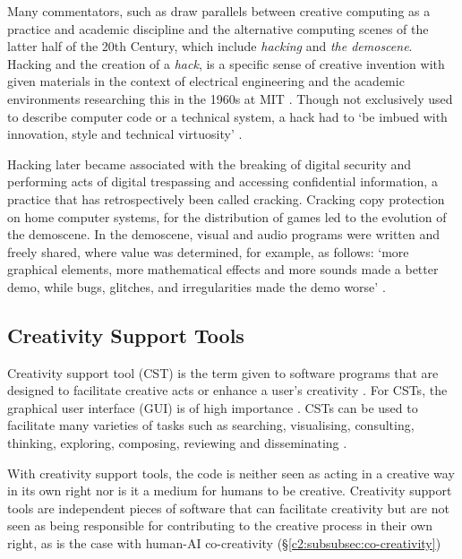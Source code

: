 Many commentators, such as \cite{clemente2025demoscene} draw parallels between creative computing as a practice and academic discipline and the alternative computing scenes of the latter half of the 20th Century, which include \textit{hacking} and \textit{the demoscene}. 
Hacking and the creation of a \textit{hack}, is a specific sense of creative invention with given materials in the context of electrical engineering and the academic environments researching this in the 1960s at MIT \citep{wark2006hackers}. 
Though not exclusively used to describe computer code or a technical system, a hack had to `be imbued with innovation, style and technical virtuosity' \citep{levy1984hackers}.

Hacking later became associated with the breaking of digital security and performing acts of digital trespassing and accessing confidential information, a practice that has retrospectively been called cracking. 
Cracking copy protection on home computer systems, for the distribution of games led to the evolution of the demoscene. 
In the demoscene, visual and audio programs were written and freely shared, where value was determined, for example, as follows: ‘more graphical elements, more mathematical effects and more sounds made a better demo, while bugs, glitches, and irregularities made the demo worse’ \citep{carlsson2019forgotten}.


\subsection{Creativity Support Tools}
\label{c2:subsec:cst}

Creativity support tool (CST) is the term given to software programs that are designed to facilitate creative acts or enhance a user's creativity \citep{shneiderman2002creativity}. 
For CSTs, the graphical user interface (GUI) is of high importance \citep{shneiderman1999user}. 
CSTs can be used to facilitate many varieties of tasks such as searching, visualising, consulting, thinking, exploring, composing, reviewing and disseminating \citep{shneiderman2002cst_tutorial}.

With creativity support tools, the code is neither seen as acting in a creative way in its own right nor is it a medium for humans to be creative. 
Creativity support tools are independent pieces of software that can facilitate creativity but are not seen as being responsible for contributing to the creative process in their own right, as is the case with human-AI co-creativity (\S \ref{c2:subsubsec:co-creativity})

